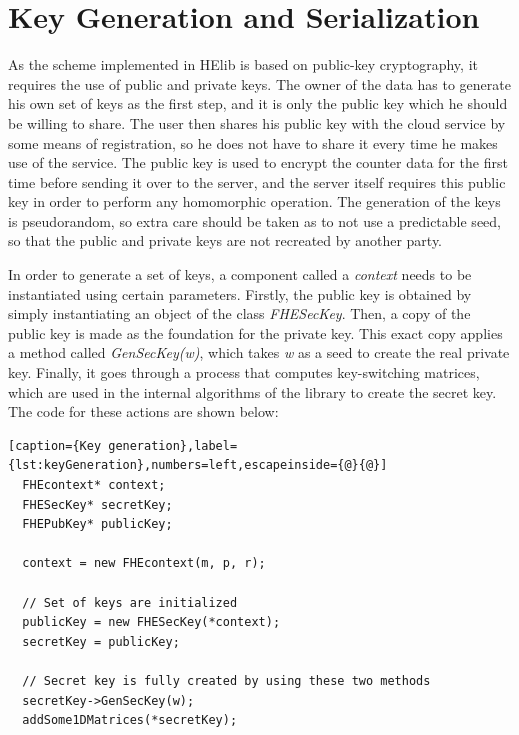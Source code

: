 \section{{Key Generation and Serialization}}

As the scheme implemented in HElib is based on public-key cryptography, it requires the use of public and private keys. The owner of the data has to generate his own set of keys as the first step, and it is only the public key which he should be willing to share. The user then shares his public key with the cloud service by some means of registration, so he does not have to share it every time he makes use of the service. The public key is used to encrypt the counter data for the first time before sending it over to the server, and the server itself requires this public key in order to perform any homomorphic operation.
The generation of the keys is pseudorandom, so extra care should be taken as to not use a predictable seed, so that the public and private keys are not recreated by another party. 

In order to generate a set of keys, a component called a \emph{context} needs to be instantiated using certain parameters. Firstly, the public key is obtained by simply instantiating an object of the class \textit{FHESecKey}. Then, a copy of the public key is made as the foundation for the private key. This exact copy applies a method called \textit{GenSecKey(w)}, which takes \textit{w} as a seed to create the real private key. Finally, it goes through a process that computes key-switching matrices, which are used in the internal algorithms of the library to create the secret key. The code for these actions are shown below:

\begin{lstlisting}[caption={Key generation},label={lst:keyGeneration},numbers=left,escapeinside={@}{@}]
  FHEcontext* context;
  FHESecKey* secretKey;
  FHEPubKey* publicKey;
  
  context = new FHEcontext(m, p, r);

  // Set of keys are initialized
  publicKey = new FHESecKey(*context);
  secretKey = publicKey;

  // Secret key is fully created by using these two methods
  secretKey->GenSecKey(w); 
  addSome1DMatrices(*secretKey); 
\end{lstlisting}

